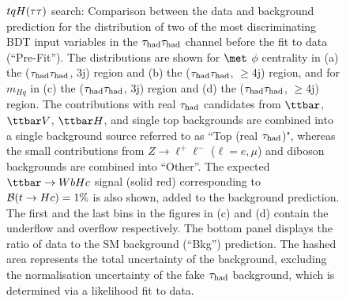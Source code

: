 \begin{figure}[t]
\begin{center}
\caption{$tqH(\tau\tau)$ search: Comparison between the data and background prediction for the distribution of two of the most 
discriminating BDT input variables in the $\tau_{\mathrm{had}} \tau_{\mathrm{had}}$ channel before the fit to data (``Pre-Fit''). The distributions are shown for
$\met$ $\phi$ centrality  in (a) the ($\tau_{\mathrm{had}} \tau_{\mathrm{had}}$, 3j) region and (b) the ($\tau_{\mathrm{had}} \tau_{\mathrm{had}}$, $\geq$4j) region, and for
$m_{Hq}$ in (c) the ($\tau_{\mathrm{had}} \tau_{\mathrm{had}}$, 3j)  region and (d) the ($\tau_{\mathrm{had}} \tau_{\mathrm{had}}$, $\geq$4j) region.
The contributions with real $\tau_{\mathrm{had}}$ candidates from $\ttbar$,  $\ttbar V$, $\ttbar H$, and single top backgrounds are combined into
a single background source referred to as ``Top (real $\tau_{\mathrm{had}}$)", whereas the small contributions from 
$Z\to \ell^+\ell^-$ ($\ell = e, \mu$) and diboson backgrounds are combined into ``Other''. 
The expected $\Hc$ signal (solid red) corresponding to $\mathcal{B}(t\to Hc)=1\%$ is also shown,
added to the background prediction.
The first and the last bins in the figures in (c) and (d) contain the underflow and overflow respectively.
The bottom panel displays the ratio of data to the SM background (``Bkg'') prediction.
The hashed area represents the total uncertainty of the background, excluding the normalisation uncertainty of the fake $\tau_{\mathrm{had}}$ background, 
which is determined via a likelihood fit to data.} 
\label{fig:BDT_inputs_hadhad_3}
\end{center}
\end{figure}


